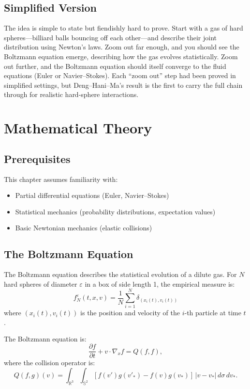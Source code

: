 \subsection{Simplified Version}
The idea is simple to state but fiendishly hard to prove. Start with a gas of hard spheres---billiard balls bouncing off each other---and describe their joint distribution using Newton's laws. Zoom out far enough, and you should see the Boltzmann equation emerge, describing how the gas evolves statistically. Zoom out further, and the Boltzmann equation should itself converge to the fluid equations (Euler or Navier--Stokes). Each ``zoom out'' step had been proved in simplified settings, but Deng--Hani--Ma's result is the first to carry the full chain through for realistic hard-sphere interactions.

\section{Mathematical Theory}

\subsection{Prerequisites}
This chapter assumes familiarity with:
\begin{itemize}
\item Partial differential equations (Euler, Navier--Stokes)
\item Statistical mechanics (probability distributions, expectation values)
\item Basic Newtonian mechanics (elastic collisions)
\end{itemize}

\subsection{The Boltzmann Equation}

The Boltzmann equation describes the statistical evolution of a dilute gas. For $N$ hard spheres of diameter $\varepsilon$ in a box of side length 1, the empirical measure is:
\[
f^\varepsilon_N(t, x, v) = \frac{1}{N} \sum_{i=1}^{N} \delta_{(x_i(t), v_i(t))}
\]
where $(x_i(t), v_i(t))$ is the position and velocity of the $i$-th particle at time $t$.

The Boltzmann equation is:
\[
\frac{\partial f}{\partial t} + v \cdot \nabla_x f = Q(f, f),
\]
where the collision operator is:
\[
Q(f, g)(v) = \int_{\mathbb{R}^3} \int_{\mathbb{S}^2} [f(v')g(v'_*) - f(v)g(v_*)] \, |v - v_*| \, d\sigma \, dv_*.
\]

